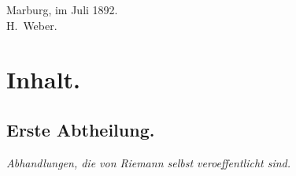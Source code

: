 \documentclass[12pt,a4paper]{book}
\theoremstyle{definition}
\theoremstyle{remark}
\begin{document}
\begin{flushright}
Marburg, im Juli 1892.\\
H.\ Weber.
\end{flushright}

\clearpage

\section*{Inhalt.}

\subsection*{Erste Abtheilung.}

\textit{Abhandlungen, die von Riemann selbst veroeffentlicht sind.}
\end{document}

